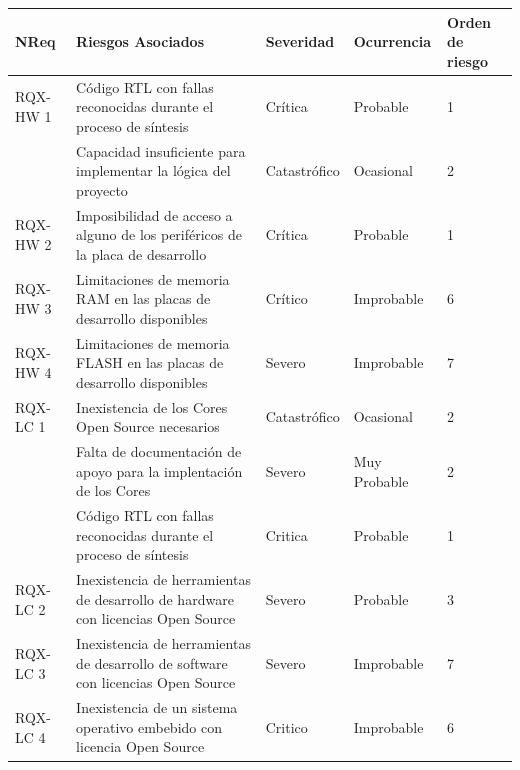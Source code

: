 		\begin{table}[!h]
		\centering
		\begin{tabular}{ p{2.5cm} p{7.5cm} p{2cm} p{2cm} p{1.5cm} }
		\hline 
		\rowcolor[gray]{0.8} N\textordmasculine Req & Riesgos Asociados & Severidad  & Ocurrencia & Orden de riesgo \\
		\hline
		RQX-HW 1& Código RTL con fallas reconocidas durante el proceso de síntesis & Crítica       & Probable	& 1 \\
		\hline
				& Capacidad insuficiente para implementar la lógica del proyecto   & Catastrófico  & Ocasional  & 2\\	 
		\hline
		RQX-HW 2& Imposibilidad de acceso a alguno de los periféricos de la placa de desarrollo &  Crítica  & Probable 	& 1\\
		\hline
		RQX-HW 3& Limitaciones de memoria RAM en las placas de desarrollo disponibles 	& Crítico  &  Improbable 	& 6\\	 
		\hline
		RQX-HW 4& Limitaciones de memoria FLASH en las placas de desarrollo disponibles & Severo  &  Improbable		& 7\\ 
		\hline
		RQX-LC 1& Inexistencia de los Cores Open Source necesarios  	& Catastrófico  &  Ocasional	& 2\\
		\hline
				& Falta de documentación de apoyo para la implentación de los Cores  & Severo  &  Muy Probable	& 2\\ 
		\hline
		 		& Código RTL con fallas reconocidas durante el proceso de síntesis   & Critica & Probable	& 1\\ 
		\hline
		RQX-LC 2& Inexistencia de herramientas de desarrollo de hardware con licencias Open Source & Severo  &  Probable & 3\\
		\hline
		RQX-LC 3& Inexistencia de herramientas de desarrollo de software con licencias Open Source & Severo  &  Improbable & 7\\
		\hline
		RQX-LC 4& Inexistencia de un sistema operativo embebido con licencia Open Source  & Critico  &  Improbable & 6\\
		

\end{tabular}
\end{table}
